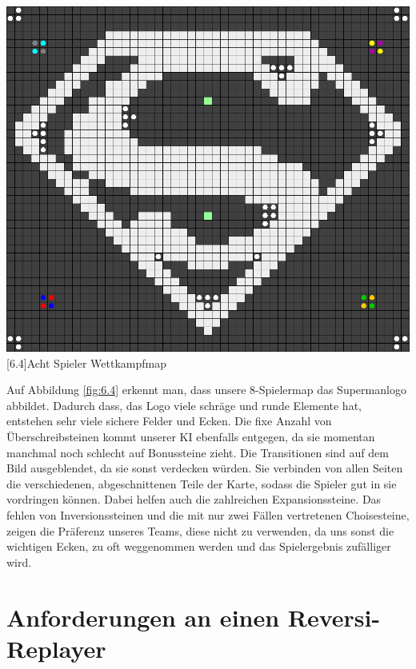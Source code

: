 \documentclass[12pt,a4paper,bibliography=totocnumbered,listof=totocnumbered]{scrartcl}
\begin{document}
		\vspace{1em}
	\begin{minipage}{\linewidth}
		\centering
		\includegraphics[width=0.66\linewidth]{pics/Kapitel_6/SupermanMap.png}
		[6.4]{Acht Spieler Wettkampfmap}
		\label{fig:6.4}
	\end{minipage}
	\vspace{1em}
	
	 Auf Abbildung \ref{fig:6.4} erkennt man, dass unsere 8-Spielermap das Supermanlogo abbildet. Dadurch dass, das Logo viele schräge und runde Elemente hat, entstehen sehr viele sichere Felder und Ecken. Die fixe Anzahl von Überschreibsteinen kommt unserer KI ebenfalls entgegen, da sie momentan manchmal noch schlecht auf Bonussteine zieht. Die Transitionen sind auf dem Bild ausgeblendet, da sie sonst verdecken würden. Sie verbinden von allen Seiten die verschiedenen, abgeschnittenen Teile der Karte, sodass die Spieler gut in sie vordringen können. Dabei helfen auch die zahlreichen Expansionssteine. Das fehlen von Inversionssteinen und die mit nur zwei Fällen vertretenen Choisesteine, zeigen die Präferenz unseres Teams, diese nicht zu verwenden, da uns sonst die wichtigen Ecken, zu oft weggenommen werden und das Spielergebnis zufälliger wird.
	
	\section{Anforderungen an einen Reversi-Replayer}
	\vspace{1em}
	
\end{document}
